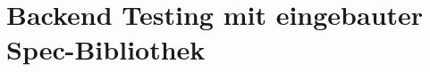 \section{Backend Testing mit eingebauter Spec-Bibliothek}
\label{sec:t_backend_testing_mit_eingebauter_spec_bibliothek'}
